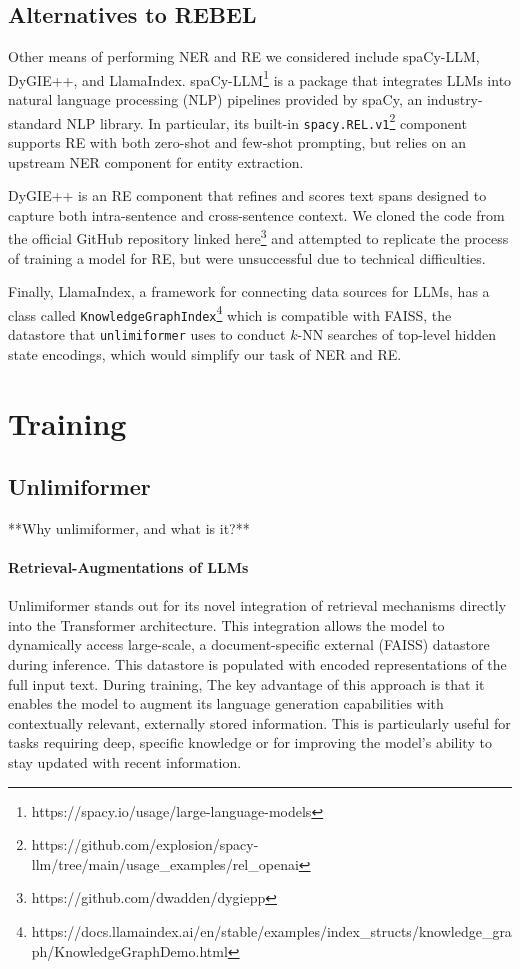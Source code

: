 \documentclass[12pt]{article}
\begin{document}

\subsection*{Alternatives to REBEL}

Other means of performing NER and RE we considered include spaCy-LLM, DyGIE++,
and LlamaIndex. spaCy-LLM\footnote{https://spacy.io/usage/large-language-models}
is a package that integrates LLMs into natural language processing (NLP) pipelines
provided by spaCy, an industry-standard NLP library.
In particular, its built-in
\texttt{spacy.REL.v1}\footnote{https://github.com/explosion/spacy-llm/tree/main/usage\_examples/rel\_openai}
component supports RE with both zero-shot and few-shot prompting, but relies on an upstream NER component for entity extraction. 

DyGIE++ is an RE component that refines and scores text spans designed to
capture both intra-sentence and cross-sentence context. We cloned the code from
the official GitHub repository linked
here\footnote{https://github.com/dwadden/dygiepp} and attempted to replicate
the process of training a model for RE, but were unsuccessful due to technical
difficulties. 

Finally, LlamaIndex, a framework for connecting data sources for LLMs, has a class called \texttt{KnowledgeGraphIndex}\footnote{https://docs.llamaindex.ai/en/stable/examples/index\_structs/knowledge\_graph/KnowledgeGraphDemo.html} which is compatible with FAISS, the datastore that \texttt{unlimiformer} uses to conduct $k$-NN searches of top-level hidden state encodings, which would simplify our task of NER and RE.

\section{Training}

\subsection*{Unlimiformer}
**Why unlimiformer, and what is it?**

\paragraph{Retrieval-Augmentations of LLMs} Unlimiformer stands out for its novel
integration of retrieval mechanisms directly into the Transformer architecture.
This integration allows the model to dynamically access large-scale, a
document-specific external
(FAISS) datastore during inference. This datastore is populated with
encoded representations of the full input text. During training,  The key advantage of this
approach is that it enables the model to augment its language generation
capabilities with contextually relevant, externally stored information. This is
particularly useful for tasks requiring deep, specific knowledge or for
improving the model's ability to stay updated with recent information.
\end{document}
